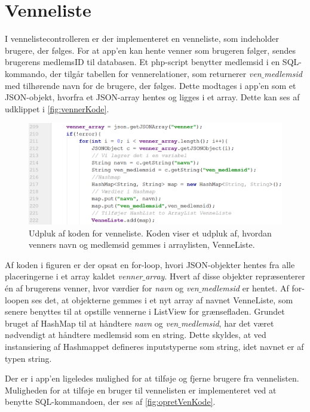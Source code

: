 \section{Venneliste}
I vennelistecontrolleren er der implementeret en venneliste, som indeholder brugere, der følges. For at app'en kan hente venner som brugeren følger, sendes brugerens medlemsID til databasen. Et php-script benytter medlemsid i en SQL-kommando, der tilgår tabellen for vennerelationer, som returnerer \textit{ven$\_$medlemsid} med tilhørende navn for de brugere, der følges. 
Dette modtages i app'en som et JSON-objekt, hvorfra et JSON-array hentes og ligges i et array. Dette kan ses af udklippet i \autoref{fig:vennerKode}.  

\begin{figure} [H]
\centering
\includegraphics[width=1\textwidth]{figures/imple/vennerKode}
\caption{Udpluk af koden for venneliste. Koden viser et udpluk af, hvordan venners navn og medlemsid gemmes i arraylisten, VenneListe.}
\label{fig:vennerKode}
\end{figure}

\noindent
Af koden i figuren er der opsat en for-loop, hvori JSON-objekter hentes fra alle placeringerne i et array kaldet \textit{venner$\_$array}. Hvert af disse objekter repræsenterer én af brugerens venner, hvor værdier for \textit{navn} og \textit{ven$\_$medlemsid} er hentet. 
Af for-loopen ses det, at objekterne gemmes i et nyt array af navnet VenneListe, som senere benyttes til at opstille vennerne i ListView for grænsefladen. Grundet bruget af HashMap til at håndtere \textit{navn} og \textit{ven$\_$medlemsid}, har det været nødvendigt at håndtere medlemsid som en string. Dette skyldes, at ved instansiering af Hashmappet defineres inputstyperne som string, idet navnet er af typen string. 

Der er i app'en ligeledes mulighed for at tilføje og fjerne brugere fra vennelisten. Muligheden for at tilføje en bruger til vennelisten er implementeret ved at benytte SQL-kommandoen, der ses af \autoref{fig:opretVenKode}.

